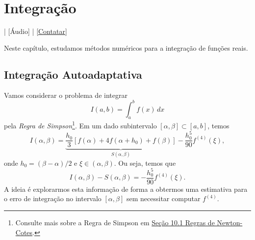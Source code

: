 
\chapter{Integração}\label{cap_integracao}
\thispagestyle{fancy}

\begin{flushright}
  [Vídeo] | [Áudio] | \href{https://phkonzen.github.io/notas/contato.html}{[Contatar]}
\end{flushright}

Neste capítulo, estudamos métodos numéricos para a integração de funções reais.

\section{Integração Autoadaptativa}\label{cap_integracao_sec_autoadapt}

Vamos considerar o problema de integrar
\begin{equation}
  I(a,b) = \int_a^b f(x)\,dx
\end{equation}
pela \emph{Regra de Simpson}\footnote{Consulte mais sobre a Regra de Simpson em \href{https://phkonzen.github.io/notas/MatematicaNumerica/cap_integr_sec_NC.html}{Seção 10.1 Regras de Newton-Cotes}.}. Em um dado subintervalo $[\alpha, \beta]\subset [a, b]$, temos
\begin{equation}
  I(\alpha, \beta) = \underbrace{\frac{h_0}{3}\left[f(\alpha) + 4f(\alpha+h_0) + f(\beta)\right]}_{S(\alpha,\beta)}-\frac{h_0^5}{90}f^{(4)}(\xi),
\end{equation}
onde $h_0=(\beta-\alpha)/2$ e $\xi\in (\alpha, \beta)$. Ou seja, temos que
\begin{equation}\label{eq:estS1}
  I(\alpha,\beta) - S(\alpha,\beta) = -\frac{h_0^5}{90}f^{(4)}(\xi).
\end{equation}
A ideia é explorarmos esta informação de forma a obtermos uma estimativa para o erro de integração no intervalo $[\alpha,\beta]$ sem necessitar computar $f^{(4)}$.


